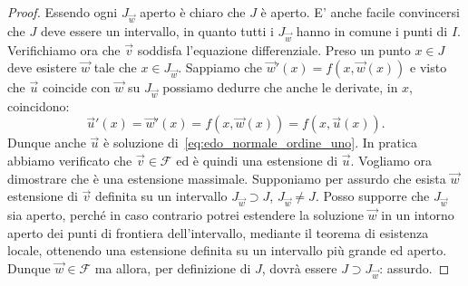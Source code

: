 \begin{proof}
Essendo ogni $J_{\vec w}$ aperto è chiaro che $J$ è aperto. E' anche facile convincersi che $J$ deve essere un intervallo, in quanto tutti i $J_{\vec w}$ hanno in comune i punti di $I$.
Verifichiamo ora che $\vec v$ soddisfa l'equazione differenziale. Preso un punto $x\in J$ deve esistere $\vec w$ tale che $x\in J_{\vec w}$. Sappiamo che $\vec w'(x) = f(x,\vec w(x))$ e visto che $\vec u$ coincide con $\vec w$ su $J_{\vec w}$ possiamo dedurre che anche le derivate, in $x$, coincidono:
\[
\vec u'(x) = \vec w'(x) = f(x,\vec w(x)) = f(x,\vec u(x)).
\]
Dunque anche $\vec u$ è soluzione di~\eqref{eq:edo_normale_ordine_uno}.
In pratica abbiamo verificato che $\vec v\in \mathcal F$ ed è quindi una estensione di $\vec u$. Vogliamo ora dimostrare che è una estensione massimale. Supponiamo per assurdo che esista $\vec w$ estensione di $\vec v$ definita su un intervallo $J_{\vec w}\supset J$, $J_{\vec w}\neq J$.
Posso supporre che $J_{\vec w}$ sia aperto, perché in caso contrario potrei estendere la soluzione $\vec w$ in un intorno aperto dei punti di frontiera dell'intervallo, mediante il teorema di esistenza locale, ottenendo una estensione definita su un intervallo più grande ed aperto.
Dunque $\vec w\in \mathcal F$ ma allora, per definizione di $J$, dovrà essere $J\supset J_{\vec w}$: assurdo.
\end{proof}

